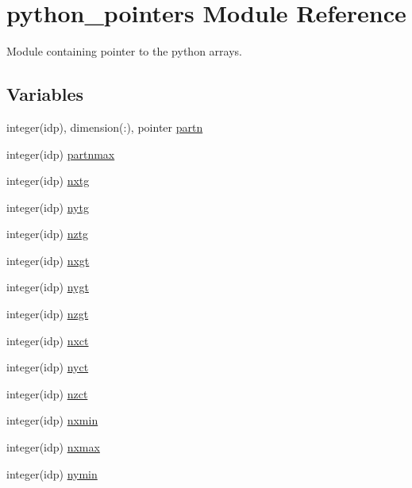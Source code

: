 \hypertarget{namespacepython__pointers}{}\section{python\+\_\+pointers Module Reference}
\label{namespacepython__pointers}


Module containing pointer to the python arrays.  


\subsection*{Variables}
\begin{DoxyCompactItemize}
\item 
integer(idp), dimension(\+:), pointer \hyperlink{namespacepython__pointers_a409a7bbbe4a92197cff88731aeb97fba}{partn}
\item 
integer(idp) \hyperlink{namespacepython__pointers_a9e83842bc27e9a1d4021ea9c0ddd0320}{partnmax}
\item 
integer(idp) \hyperlink{namespacepython__pointers_a6782a08a4b8ecdfc9b04ae74f62f30fe}{nxtg}
\item 
integer(idp) \hyperlink{namespacepython__pointers_adee3650ff1605023328d78c974995de9}{nytg}
\item 
integer(idp) \hyperlink{namespacepython__pointers_a46103f36ebf9246b4fb558d8ceaee49d}{nztg}
\item 
integer(idp) \hyperlink{namespacepython__pointers_ae4f4f06a80f2084571ee0a1f4b3348c3}{nxgt}
\item 
integer(idp) \hyperlink{namespacepython__pointers_a244755ce8318f2ada30b4163ed6daa0b}{nygt}
\item 
integer(idp) \hyperlink{namespacepython__pointers_a69e8ac761b1c3caaf7bf2d9a67913963}{nzgt}
\item 
integer(idp) \hyperlink{namespacepython__pointers_a75ab930be0836b533be53654ce5e7e94}{nxct}
\item 
integer(idp) \hyperlink{namespacepython__pointers_a3c053835361f80faa80f73c6137642a5}{nyct}
\item 
integer(idp) \hyperlink{namespacepython__pointers_ae97e07344d71818baae6eed1845e70d6}{nzct}
\item 
integer(idp) \hyperlink{namespacepython__pointers_a7354ad2c641955bc8b9dfed923d3131f}{nxmin}
\item 
integer(idp) \hyperlink{namespacepython__pointers_a430f791c79026fff09c2ba1b34826ca4}{nxmax}
\item 
integer(idp) \hyperlink{namespacepython__pointers_a56cf20a0f24cba392394189aa38886da}{nymin}

\end{DoxyCompactItemize}
